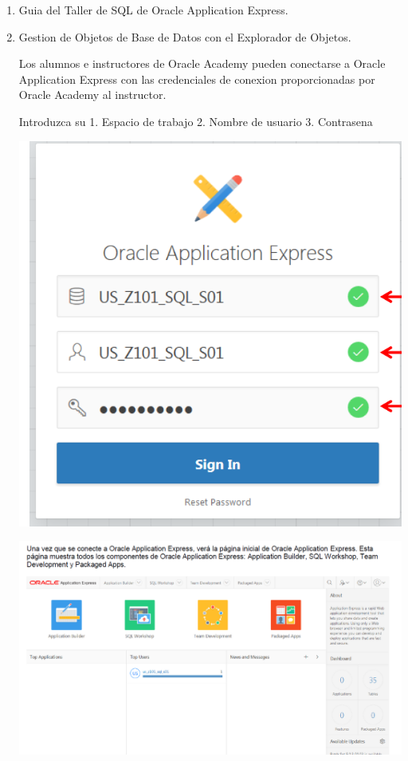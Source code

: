 \documentclass[12pt,letterpaper]{article}
\begin{document}
\begin{enumerate}[1.]
    \item  Guia del Taller de SQL de Oracle Application Express. 
     
    \item Gestion de Objetos de Base de Datos con el Explorador de Objetos.
    
    Los alumnos e instructores de Oracle Academy pueden conectarse a Oracle Application Express con las credenciales de conexion proporcionadas por Oracle Academy al instructor.
    
    Introduzca su
1. Espacio de trabajo
2. Nombre de usuario
3. Contrasena
    
       \includegraphics[width=15cm]{./carolinaImagen/8.png}
       
       
       
       
       
        \includegraphics[width=15cm]{./carolinaImagen/9.png}
       

\end{enumerate}
\end{document}

